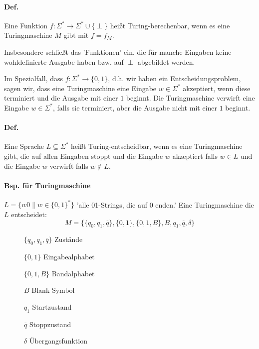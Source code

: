 \paragraph*{Def.} Eine Funktion $f:\Sigma^* \rightarrow\Sigma^* \cup \{ \perp \}$ heißt Turing-berechenbar, wenn es eine Turingmaschine $M$ gibt mit $f=f_M$.

\par\medskip
Insbesondere schließt das 'Funktionen' ein, die für manche Eingaben keine wohldefinierte Ausgabe haben bzw. auf $\perp$ abgebildet werden.\par\medskip

Im Spezialfall, dass $f:\Sigma^* \rightarrow \{ 0,1 \}$, d.h. wir haben ein Entscheidungsproblem, sagen wir, dass eine Turingmaschine eine Eingabe $w \in \Sigma^*$ akzeptiert, wenn diese terminiert und die Ausgabe mit einer $1$ beginnt. Die Turingmaschine verwirft eine Eingabe $w \in \Sigma^*$, falls sie terminiert, aber die Ausgabe nicht mit einer $1$ beginnt.\par\medskip

\paragraph*{Def.} Eine Sprache $L \subseteq \Sigma^*$ heißt Turing-entscheidbar, wenn es eine Turingmaschine gibt, die auf allen Eingaben stoppt und die Eingabe $w$ akzeptiert falls $w \in L$ und die Eingabe $w$ verwirft falls $w \not\in L$.

\paragraph*{Bsp. für Turingmaschine} $L=\{ w0\|w \in \{ 0,1 \}^* \}$ 'alle 01-Strings, die auf 0 enden.' Eine Turingmaschine die $L$ entscheidet: $$ M=\{ \{q_0,q_1,\overline{q}\}, \{0,1\}, \{0,1,B\}, B, q_1, \overline{q}, \delta \} $$
\begin{description}
	\item[] $\{q_0,q_1,\overline{q}\}$ Zustände
	\item[] $\{0,1\}$ Eingabealphabet
	\item[] $\{0,1,B\}$ Bandalphabet
	\item[] $B$ Blank-Symbol
	\item[] $q_1$ Startzustand
	\item[] $\overline{q}$ Stoppzustand
	\item[] $\delta$ Übergangsfunktion
\end{description}

